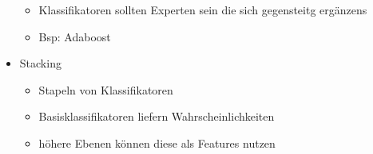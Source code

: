 \documentclass{article} %
\begin{document}
\begin{itemize}
\begin{itemize}
			\item Klassifikatoren sollten Experten sein die sich gegensteitg ergänzens
			\item Bsp: Adaboost
		\end{itemize}
		\item Stacking
		\begin{itemize}
			\item Stapeln von Klassifikatoren
			\item Basisklassifikatoren liefern Wahrscheinlichkeiten
			\item höhere Ebenen können diese als Features nutzen
		\end{itemize}
	\end{itemize}


\end{document}
